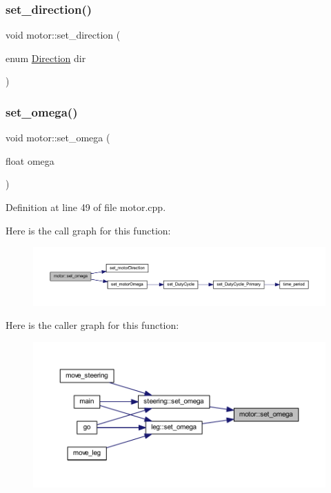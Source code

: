 \subsubsection{\texorpdfstring{set\_direction()}{set\_direction()}}
{\footnotesize\ttfamily void motor\+::set\+\_\+direction (\begin{DoxyParamCaption}\item[{enum \mbox{\hyperlink{motor_8h_a224b9163917ac32fc95a60d8c1eec3aa}{Direction}}}]{dir }\end{DoxyParamCaption})}

\mbox{\label{classmotor_aafd4845142b5d311ea73331b3ae1bb33}} 
\subsubsection{\texorpdfstring{set\_omega()}{set\_omega()}}
{\footnotesize\ttfamily void motor\+::set\+\_\+omega (\begin{DoxyParamCaption}\item[{float}]{omega }\end{DoxyParamCaption})}



Definition at line 49 of file motor.\+cpp.

Here is the call graph for this function\+:
\nopagebreak
\begin{figure}[H]
\begin{center}
\leavevmode
\includegraphics[width=350pt]{classmotor_aafd4845142b5d311ea73331b3ae1bb33_cgraph}
\end{center}
\end{figure}
Here is the caller graph for this function\+:
\nopagebreak
\begin{figure}[H]
\begin{center}
\leavevmode
\includegraphics[width=350pt]{classmotor_aafd4845142b5d311ea73331b3ae1bb33_icgraph}
\end{center}
\end{figure}


